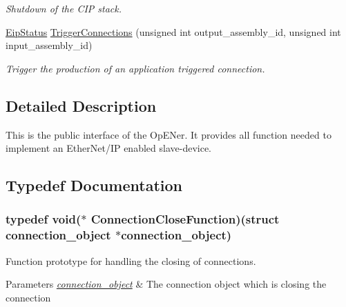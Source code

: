 \begin{DoxyCompactItemize}
\begin{DoxyCompactList}\small\item\em \-Shutdown of the \-C\-I\-P stack. \end{DoxyCompactList}\item 
\hyperlink{typedefs_8h_a3dcc5f7837c120360f8cc88a76781709}{\-Eip\-Status} \hyperlink{group__CIP__API_ga286de29d4e88bd1fec0611e75c288faf}{\-Trigger\-Connections} (unsigned int output\-\_\-assembly\-\_\-id, unsigned int input\-\_\-assembly\-\_\-id)
\begin{DoxyCompactList}\small\item\em \-Trigger the production of an application triggered connection. \end{DoxyCompactList}\end{DoxyCompactItemize}


\subsection{\-Detailed \-Description}
\-This is the public interface of the \-Op\-E\-Ner. \-It provides all function needed to implement an \-Ether\-Net/\-I\-P enabled slave-\/device. 

\subsection{\-Typedef \-Documentation}
\hypertarget{group__CIP__API_ga754f77d4872724e212cf1d9d7d84d406}{
\subsubsection[{\-Connection\-Close\-Function}]{\setlength{\rightskip}{0pt plus 5cm}typedef void($\ast$ {\bf \-Connection\-Close\-Function})(struct {\bf connection\-\_\-object} $\ast${\bf connection\-\_\-object})}}\label{d2/dc9/group__CIP__API_ga754f77d4872724e212cf1d9d7d84d406}


\-Function prototype for handling the closing of connections. 


\begin{DoxyParams}{\-Parameters}
{\em \hyperlink{structconnection__object}{connection\-\_\-object}} & \-The connection object which is closing the connection \\
\hline
\end{DoxyParams}


